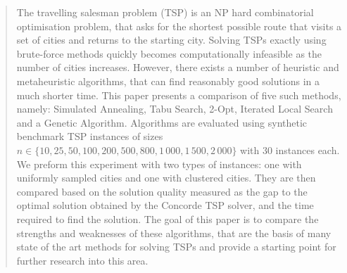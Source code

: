\begin{abstract}
	The travelling salesman problem (TSP) is an NP hard combinatorial optimisation problem,
	that asks for the shortest possible route that visits a set of cities
	and returns to the starting city. Solving TSPs exactly using brute-force methods
	quickly becomes computationally infeasible as the number of cities increases.
	However, there exists a number of heuristic and metaheuristic algorithms, that
	can find reasonably good solutions in a much shorter time. This paper presents
	a comparison of five such methods, namely: Simulated Annealing, Tabu Search,
	2-Opt, Iterated Local Search and a Genetic Algorithm. Algorithms are evaluated
	using synthetic benchmark TSP instances of sizes \(n \in \{10, 25, 50, 100, 200, 500, 800, 1\,000, 1\,500, 2\,000\}\) with 30
	instances each. We preform this experiment with two types of instances: one with
	uniformly sampled cities and one with clustered cities. They are then compared
	based on the solution quality measured as the gap to the optimal solution obtained
	by the Concorde TSP solver, and the time required to find the solution. The goal
	of this paper is to compare the strengths and weaknesses of these algorithms, that
	are the basis of many state of the art methods for solving TSPs and provide a
	starting point for further research into this area.

\end{abstract}
